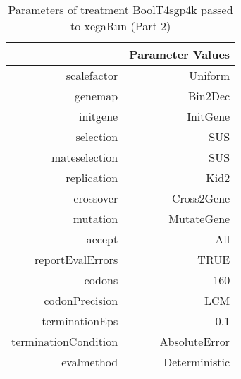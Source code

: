 \begin{table}[ht]
\centering
\begin{tabular}{rr}
  \hline
 & Parameter Values \\ 
  \hline
scalefactor & Uniform \\ 
  genemap & Bin2Dec \\ 
  initgene & InitGene \\ 
  selection & SUS \\ 
  mateselection & SUS \\ 
  replication & Kid2 \\ 
  crossover & Cross2Gene \\ 
  mutation & MutateGene \\ 
  accept & All \\ 
  reportEvalErrors & TRUE \\ 
  codons & 160 \\ 
  codonPrecision & LCM \\ 
  terminationEps & -0.1 \\ 
  terminationCondition & AbsoluteError \\ 
  evalmethod & Deterministic \\ 
   \hline
\end{tabular}
\caption{ Parameters of treatment BoolT4sgp4k passed to xegaRun
 (Part 2)} 
\end{table}
